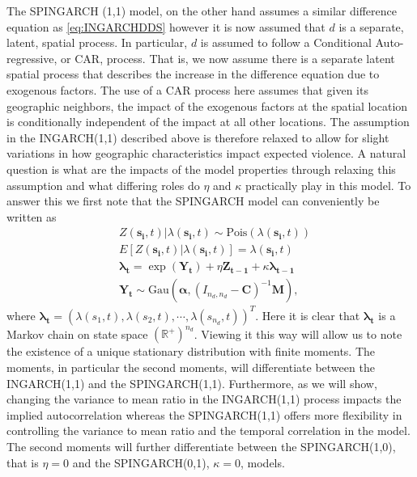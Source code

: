 \documentclass[11pt]{isuthesis}
\begin{document}
The SPINGARCH (1,1) model, on the other hand assumes a similar difference equation as \eqref{eq:INGARCHDDS} however it is now assumed that $d$ is a separate, latent, spatial process.  In particular, $d$ is assumed to follow a Conditional Auto-regressive, or CAR, process.  That is, we now assume there is a separate latent spatial process that describes the increase in the difference equation due to exogenous factors. The use of a CAR process here assumes that given its geographic neighbors, the impact of the exogenous factors at the spatial location is conditionally independent of the impact at all other locations.  The assumption in the INGARCH(1,1) described above is therefore relaxed to allow for slight variations in how geographic characteristics impact expected violence.  A natural question is what are the impacts of the model properties through relaxing this assumption and what differing roles do $\eta$ and $\kappa$ practically play in this model.  To answer this we first note that the SPINGARCH model can conveniently be written as
\begin{align}
	& Z(\boldsymbol{s_i},t)|\lambda(\boldsymbol{s_i},t) \sim \mbox{Pois}(\lambda(\boldsymbol{s_i},t)) \label{eq:timeseries2} \\
	& E[Z(\boldsymbol{s_i},t)|\lambda(\boldsymbol{s_i},t)]=\lambda(\boldsymbol{s_i},t)\nonumber\\
	& \boldsymbol{\lambda_t} = \exp(\boldsymbol{Y_t})+\eta \boldsymbol{Z_{t-1}}+\kappa \boldsymbol{\lambda_{t-1}}\nonumber\\
	& \boldsymbol{Y_t} \sim \mbox{Gau}\textit{} (\boldsymbol{\alpha},(I_{{n_d},{n_d}}-\boldsymbol{C})^{-1}\boldsymbol{M}),\nonumber
\end{align}
where $\boldsymbol{\lambda_t}=\left(\lambda(s_1,t),\lambda(s_2,t),\cdots,\lambda(s_{n_d},t)\right)^T$.  Here it is clear that $\boldsymbol{\lambda_t}$ is a Markov chain on state space $(\mathbb{R}^{+})^{n_d}$.  Viewing it this way will allow us to note the existence of a unique stationary distribution with finite moments.  The moments, in particular the second moments, will differentiate between the INGARCH(1,1) and the SPINGARCH(1,1).  Furthermore, as we will show, changing the variance to mean ratio in the INGARCH(1,1) process impacts the implied autocorrelation whereas the SPINGARCH(1,1) offers more flexibility in controlling the variance to mean ratio and the temporal correlation in the model.  The second moments will further differentiate between the SPINGARCH(1,0), that is $\eta=0$ and the SPINGARCH(0,1), $\kappa=0$, models.  
\end{document}

